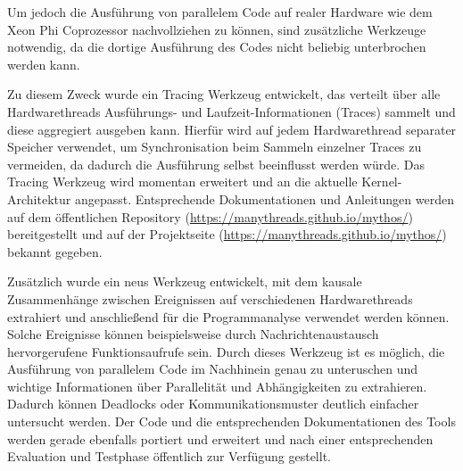 Um jedoch die Ausführung von parallelem Code auf realer Hardware wie dem Xeon
Phi Coprozessor nachvollziehen zu können, sind zusätzliche Werkzeuge notwendig,
da die dortige Ausführung des Codes nicht beliebig unterbrochen werden kann.

Zu diesem Zweck wurde ein Tracing Werkzeug entwickelt, das verteilt über alle
Hardwarethreads Ausführungs- und Laufzeit-Informationen (Traces) sammelt und
diese aggregiert ausgeben kann.
Hierfür wird auf jedem Hardwarethread separater Speicher verwendet, um
Synchronisation beim Sammeln einzelner Traces zu vermeiden, da dadurch die
Ausführung selbst beeinflusst werden würde.  Das Tracing Werkzeug wird momentan erweitert
und an die aktuelle Kernel-Architektur angepasst. Entsprechende Dokumentationen
und Anleitungen werden auf dem öffentlichen Repository
(\url{https://manythreads.github.io/mythos/}) bereitgestellt und auf der
Projektseite (\url{https://manythreads.github.io/mythos/}) bekannt gegeben.

Zusätzlich wurde ein neus Werkzeug entwickelt, mit dem kausale Zusammenhänge
zwischen Ereignissen auf verschiedenen Hardwarethreads extrahiert und
anschließend für die Programmanalyse verwendet werden können. Solche Ereignisse
können beispielsweise durch Nachrichtenaustausch hervorgerufene Funktionsaufrufe
sein. Durch dieses Werkzeug ist es möglich, die Ausführung von parallelem Code
im Nachhinein genau zu unteruschen und wichtige Informationen über Parallelität und
Abhängigkeiten zu extrahieren. Dadurch können Deadlocks oder
Kommunikationsmuster deutlich einfacher untersucht werden. Der Code und die
entsprechenden Dokumentationen des Tools werden gerade ebenfalls portiert und
erweitert und nach einer entsprechenden Evaluation und Testphase öffentlich zur
Verfügung gestellt.

% 
% 


